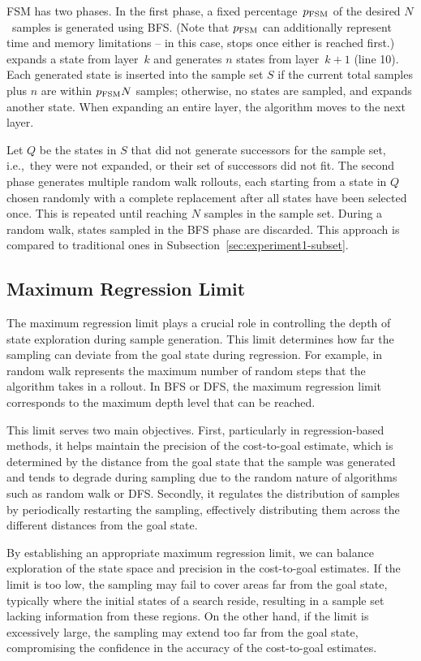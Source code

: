 FSM has two phases. In the first phase, a fixed percentage~$p_\text{FSM}$ of the desired $N$~samples is generated using BFS. (Note that $p_\text{FSM}$ can additionally represent time and memory limitations -- in this case, \bfs stops once either is reached first.) \bfs expands a state from layer~$k$ and generates $n$ states from layer~$k+1$ (line 10). Each generated state is inserted into the sample set $S$ if the current total samples plus $n$ are within $p_{\text{FSM}}N$ samples; otherwise, no states are sampled, and \bfs expands another state. When expanding an entire layer, the algorithm moves to the next layer.

Let $Q$ be the states in $S$ that did not generate successors for the sample set, i.e.,~they were not expanded, or their set of successors did not fit. The second phase generates multiple random walk rollouts, each starting from a state in $Q$ chosen randomly with a complete replacement after all states have been selected once. This is repeated until reaching $N$ samples in the sample set. During a random walk, states sampled in the BFS phase are discarded. This approach is compared to traditional ones in Subsection~\ref{sec:experiment1-subset}.

\subsection{Maximum Regression Limit}
\label{sec:rollout-depth-limit}

The maximum regression limit plays a crucial role in controlling the depth of state exploration during sample generation. This limit determines how far the sampling can deviate from the goal state during regression. For example, in random walk represents the maximum number of random steps that the algorithm takes in a rollout. In BFS or DFS, the maximum regression limit corresponds to the maximum depth level that can be reached.

This limit serves two main objectives. First, particularly in regression-based methods, it helps maintain the precision of the cost-to-goal estimate, which is determined by the distance from the goal state that the sample was generated and tends to degrade during sampling due to the random nature of algorithms such as random walk or DFS. Secondly, it regulates the distribution of samples by periodically restarting the sampling, effectively distributing them across the different distances from the goal state.

By establishing an appropriate maximum regression limit, we can balance exploration of the state space and precision in the cost-to-goal estimates. If the limit is too low, the sampling may fail to cover areas far from the goal state, typically where the initial states of a search reside, resulting in a sample set lacking information from these regions. On the other hand, if the limit is excessively large, the sampling may extend too far from the goal state, compromising the confidence in the accuracy of the cost-to-goal estimates.

